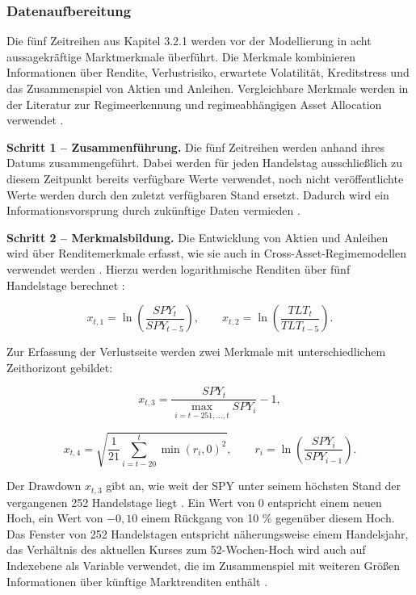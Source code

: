 \subsubsection{Datenaufbereitung}
Die fünf Zeitreihen aus Kapitel 3.2.1 werden vor der Modellierung in acht aussagekräftige Marktmerkmale überführt. Die Merkmale kombinieren Informationen über Rendite, Verlustrisiko, erwartete Volatilität, Kreditstress und das Zusammenspiel von Aktien und Anleihen. Vergleichbare Merkmale werden in der Literatur zur Regimeerkennung und regimeabhängigen Asset Allocation verwendet \cite{ang_regime_2012, ang_international_2002, page_when_2018, polavarapu_cross-asset_2026}.

\vspace{0.5cm}

\textbf{Schritt 1 – Zusammenführung.} Die fünf Zeitreihen werden anhand ihres Datums zusammengeführt. Dabei werden für jeden Handelstag ausschließlich zu diesem Zeitpunkt bereits verfügbare Werte verwendet, noch nicht veröffentlichte Werte werden durch den zuletzt verfügbaren Stand ersetzt. Dadurch wird ein Informationsvorsprung durch zukünftige Daten vermieden \cite[4]{yang_information_leakage_2024}.

\vspace{0.5cm}

\textbf{Schritt 2 – Merkmalsbildung.} Die Entwicklung von Aktien und Anleihen wird über Renditemerkmale erfasst, wie sie auch in Cross-Asset-Regimemodellen verwendet werden \cite{ang_regime_2012, polavarapu_cross-asset_2026}. Hierzu werden logarithmische Renditen über fünf Handelstage berechnet \cite[223-224]{cont_empirical_2001}:

 $$
x_{t,1}=\ln\left(\frac{SPY_t}{SPY_{t-5}}\right),
\qquad
x_{t,2}=\ln\left(\frac{TLT_t}{TLT_{t-5}}\right).
$$

Zur Erfassung der Verlustseite werden zwei Merkmale mit unterschiedlichem Zeithorizont gebildet:

$$
x_{t,3}
=
\frac{SPY_t}
{\max_{i=t-251,\ldots,t}SPY_i}-1,
$$

$$
x_{t,4}
=
\sqrt{\frac{1}{21}
\sum_{i=t-20}^{t}\min(r_i,0)^2},
\qquad
r_i=\ln\left(\frac{SPY_i}{SPY_{i-1}}\right).
$$

Der Drawdown $x_{t,3}$ gibt an, wie weit der SPY unter seinem höchsten Stand der vergangenen 252 Handelstage liegt \cite{chekhlov_drawdown_2005}. Ein Wert von $0$ entspricht einem neuen Hoch, ein Wert von $-0{,}10$ einem Rückgang von 10 \% gegenüber diesem Hoch. Das Fenster von 252 Handelstagen entspricht näherungsweise einem Handelsjahr, das Verhältnis des aktuellen Kurses zum 52-Wochen-Hoch wird auch auf Indexebene als Variable verwendet, die im Zusammenspiel mit weiteren Größen Informationen über künftige Marktrenditen enthält \cite[10, 15]{li_investor_2012}.

